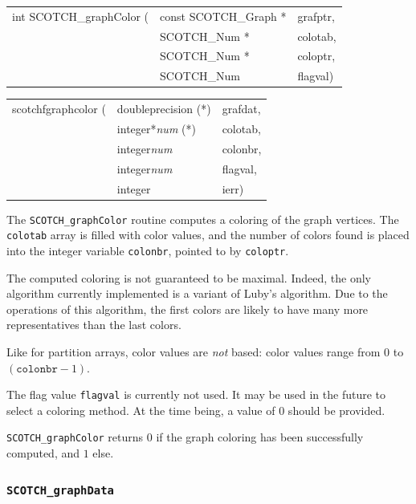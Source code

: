 \begin{itemize}
\progsyn

{\tt\begin{tabular}{l@{}ll}
int SCOTCH\_graphColor ( & const SCOTCH\_Graph * & grafptr, \\
                         & SCOTCH\_Num *         & colotab, \\
                         & SCOTCH\_Num *         & coloptr, \\
                         & SCOTCH\_Num           & flagval)
\end{tabular}}

{\tt\begin{tabular}{l@{}ll}
scotchfgraphcolor ( & doubleprecision (*)   & grafdat, \\
                    & integer*{\it num} (*) & colotab, \\
                    & integer{\it num}      & colonbr, \\
                    & integer{\it num}      & flagval, \\
                    & integer               & ierr)

\end{tabular}}

\progdes

The {\tt SCOTCH\_graphColor} routine computes a coloring of the graph
vertices. The {\tt colotab} array is filled with color values, and the
number of colors found is placed into the integer variable
{\tt colonbr}, pointed to by {\tt coloptr}.

The computed coloring is not guaranteed to be maximal. Indeed,
the only algorithm currently implemented is a variant of Luby's
algorithm. Due to the operations of this algorithm, the first colors
are likely to have many more representatives than the last colors.

Like for partition arrays, color values are \textit{not} based: color
values range from $0$ to $(\mathtt{colonbr} - 1)$.

The flag value {\tt flagval} is currently not used. It may be used in
the future to select a coloring method. At the time being, a value of
$0$ should be provided.

\progret

{\tt SCOTCH\_graphColor} returns $0$ if the graph coloring has been
successfully computed, and $1$ else.
\end{itemize}

\subsubsection{{\tt SCOTCH\_graphData}}
\label{sec-lib-func-graphdata}

